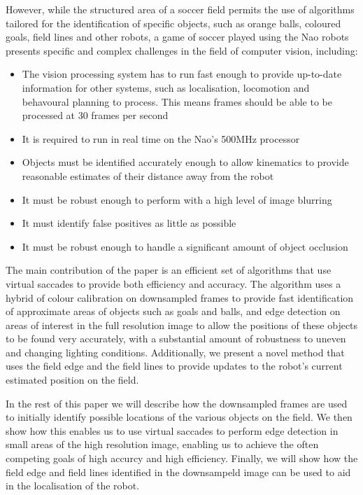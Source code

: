 \documentclass[runningheads,a4paper]{llncs}
\begin{document}
However, while the structured area of a soccer field permits the use of algorithms tailored for the identification of specific objects, such as orange balls, coloured goals, field lines and other robots, a game of soccer played using the Nao robots presents specific and complex challenges in the field of computer vision, including: \begin{itemize}
\item{The vision processing system has to run fast enough to provide up-to-date information for other systems, such as localisation, locomotion and behavoural planning to process. This means frames should be able to be processed at 30 frames per second}
\item{It is required to run in real time on the Nao's 500MHz processor}
\item{Objects must be identified accurately enough to allow kinematics to provide reasonable estimates of their distance away from the robot}
\item{It must be robust enough to perform with a high level of image blurring}
\item{It must identify false positives as little as possible}
\item{It must be robust enough to handle a significant amount of object occlusion}
\end{itemize}

The main contribution of the paper is an efficient set of algorithms that use virtual saccades to provide both efficiency and accuracy. The algorithm uses a hybrid of colour calibration on downsampled frames to provide fast identification of approximate areas of objects such as goals and balls, and edge detection on areas of interest in the full resolution image to allow the positions of these objects to be found very accurately, with a substantial amount of robustness to uneven and changing lighting conditions. Additionally, we present a novel method that uses the field edge and the field lines to provide updates to the robot's current estimated position on the field.

In the rest of this paper we will describe how the downsampled frames are used to initially identify possible locations of the various objects on the field. We then show how this enables us to use virtual saccades to perform edge detection in small areas of the high resolution image, enabling us to achieve the often competing goals of high accurcy and high efficiency. Finally, we will show how the field edge and field lines identified in the downsampeld image can be used to aid in the localisation of the robot.
\end{document}

